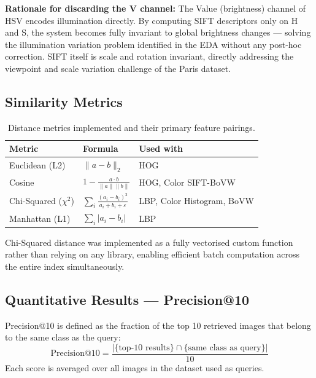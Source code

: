 \documentclass[11pt, a4paper]{article}
\begin{document}
\textbf{Rationale for discarding the V channel:} The Value (brightness) channel of HSV encodes illumination directly. By computing SIFT descriptors only on H and S, the system becomes fully invariant to global brightness changes — solving the illumination variation problem identified in the EDA without any post-hoc correction. SIFT itself is scale and rotation invariant, directly addressing the viewpoint and scale variation challenge of the Paris dataset.

\subsection{Similarity Metrics}

\begin{table}[H]
\centering
\begin{tabular}{@{}lll@{}}
\toprule
\textbf{Metric} & \textbf{Formula} & \textbf{Used with} \\ \midrule
Euclidean (L2) & $\|a - b\|_2$ & HOG \\
Cosine & $1 - \frac{a \cdot b}{\|a\|\|b\|}$ & HOG, Color SIFT-BoVW \\
Chi-Squared ($\chi^2$) & $\sum_i \frac{(a_i - b_i)^2}{a_i + b_i + \varepsilon}$ & LBP, Color Histogram, BoVW \\
Manhattan (L1) & $\sum_i |a_i - b_i|$ & LBP \\ \bottomrule
\end{tabular}
\caption{Distance metrics implemented and their primary feature pairings.}
\label{tab:metrics}
\end{table}

Chi-Squared distance was implemented as a fully vectorised custom function rather than relying on any library, enabling efficient batch computation across the entire index simultaneously.

\subsection{Quantitative Results — Precision@10}

Precision@10 is defined as the fraction of the top 10 retrieved images that belong to the same class as the query:
\[
  \text{Precision@10} = \frac{|\{\text{top-10 results}\} \cap \{\text{same class as query}\}|}{10}
\]
Each score is averaged over all images in the dataset used as queries.
\end{document}
